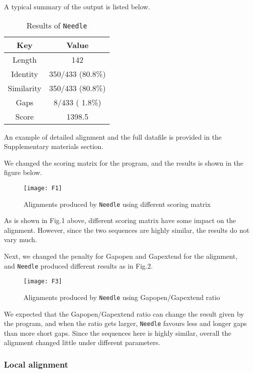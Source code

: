 \documentclass[en,black,10pt,normal]{elegantnote}
\begin{document}
A typical summary of the output is listed below.

\begin{table}[H]
    \caption{Results of \texttt{Needle}}
    \centering
    \begin{tabular}{cc}
        \toprule
        Key&Value\\
        \midrule
        Length&142\\
        Identity&350/433 (80.8\%)\\
        Similarity&350/433 (80.8\%)\\
        Gaps&8/433 ( 1.8\%)\\
        Score&1398.5\\
        \bottomrule
    \end{tabular}
\end{table}

An example of detailed alignment and the full datafile is provided in the Supplementary materials section.

We changed the scoring matrix for the program, and the results is shown in the figure below.

\begin{figure}[H]
    \centering
    \texttt{[image: F1]}
    \caption{Alignments produced by \texttt{Needle} using different scoring matrix}
    \label{F1}
\end{figure}

As is shown in Fig.1 above, different scoring matrix have some impact on the alignment.
However, since the two sequences are highly similar, the results do not vary much.

Next, we changed the penalty for Gapopen and Gapextend for the alignment, 
and \texttt{Needle} produced different results as in Fig.2.

\begin{figure}[H]
    \centering
    \texttt{[image: F3]}
    \caption{Alignments produced by \texttt{Needle} using Gapopen/Gapextend ratio}
    \label{F2}
\end{figure}

We expected that the Gapopen/Gapextend ratio can change the result given by the program, 
and when the ratio gets larger, \texttt{Needle} favours less and longer gaps than
more short gaps. Since the sequences here is highly similar, overall the alignment changed little
under different parameters.

\subsubsection{Local alignment}
\end{document}
